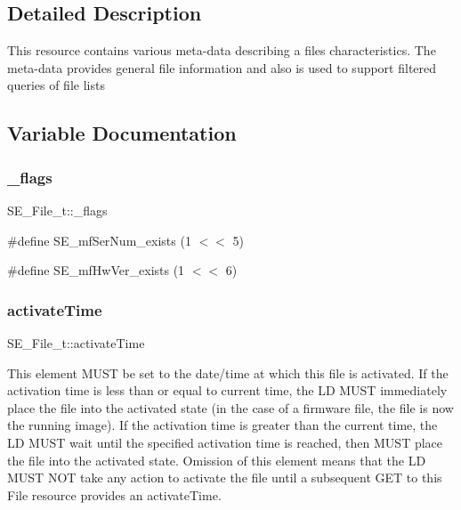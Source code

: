 \subsection{Detailed Description}
This resource contains various meta-\/data describing a file\textquotesingle{}s characteristics. The meta-\/data provides general file information and also is used to support filtered queries of file lists 

\subsection{Variable Documentation}
\mbox{\label{group__File_gaf9fb522b583f585ebfa63bf9aae654c4}} 
\subsubsection{\texorpdfstring{\+\_\+flags}{\_flags}}
{\footnotesize\ttfamily S\+E\+\_\+\+File\+\_\+t\+::\+\_\+flags}

\#define S\+E\+\_\+mf\+Ser\+Num\+\_\+exists (1 $<$$<$ 5)

\#define S\+E\+\_\+mf\+Hw\+Ver\+\_\+exists (1 $<$$<$ 6) \mbox{\label{group__File_ga10cf0e5d17ce214712253641b664a0a4}} 
\subsubsection{\texorpdfstring{activate\+Time}{activateTime}}
{\footnotesize\ttfamily S\+E\+\_\+\+File\+\_\+t\+::activate\+Time}

This element M\+U\+ST be set to the date/time at which this file is activated. If the activation time is less than or equal to current time, the LD M\+U\+ST immediately place the file into the activated state (in the case of a firmware file, the file is now the running image). If the activation time is greater than the current time, the LD M\+U\+ST wait until the specified activation time is reached, then M\+U\+ST place the file into the activated state. Omission of this element means that the LD M\+U\+ST N\+OT take any action to activate the file until a subsequent G\+ET to this File resource provides an activate\+Time. \mbox{\label{group__File_ga291723dcc840904ef8ca0ee385c935a3}} 
